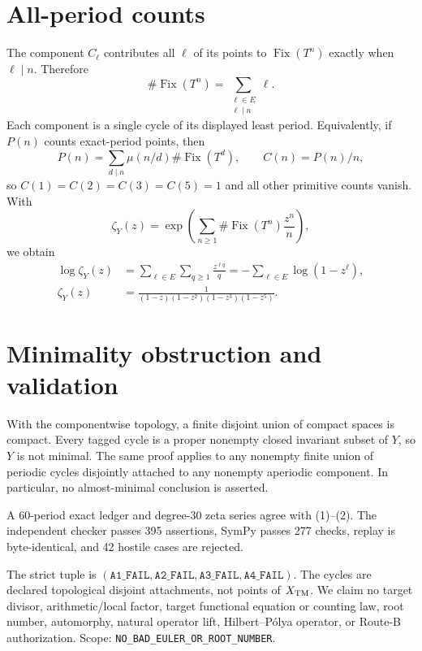 \documentclass[10pt]{article}
\begin{document}
\section{All-period counts}
The component $C_\ell$ contributes all $\ell$ of its points to
$\operatorname{Fix}(T^n)$ exactly when $\ell\mid n$.  Therefore
\begin{equation}
\#\operatorname{Fix}(T^n)=\sum_{\substack{\ell\in E\\\ell\mid n}}\ell .\tag{1}
\end{equation}
Each component is a single cycle of its displayed least period.  Equivalently,
if $P(n)$ counts exact-period points, then
\[
P(n)=\sum_{d\mid n}\mu(n/d)\#\operatorname{Fix}(T^d),
\qquad C(n)=P(n)/n,
\]
so $C(1)=C(2)=C(3)=C(5)=1$ and all other primitive counts vanish.  With
\[
\zeta_Y(z)=\exp\left(\sum_{n\geq1}\#\operatorname{Fix}(T^n)\frac{z^n}{n}\right),
\]
we obtain
\begin{align*}
\log\zeta_Y(z)
 &=\sum_{\ell\in E}\sum_{q\geq1}\frac{z^{\ell q}}q
 =-\sum_{\ell\in E}\log(1-z^\ell),\\
\zeta_Y(z)&=\frac1{(1-z)(1-z^2)(1-z^3)(1-z^5)}.\tag{2}
\end{align*}

\section{Minimality obstruction and validation}
With the componentwise topology, a finite disjoint union of compact spaces is
compact.  Every tagged cycle is a proper nonempty closed invariant subset of
$Y$, so $Y$ is not minimal.  The same proof applies to any nonempty finite
union of periodic cycles disjointly attached to any nonempty aperiodic
component.  In particular, no almost-minimal conclusion is asserted.

A 60-period exact ledger and degree-30 zeta series agree
with (1)--(2).  The independent checker passes 395 assertions, SymPy passes
277 checks, replay is byte-identical, and 42 hostile cases are rejected.

The strict tuple is $(\texttt{A1\_FAIL},\texttt{A2\_FAIL},
\texttt{A3\_FAIL},\texttt{A4\_FAIL})$.  The cycles are declared topological
disjoint attachments,
not points of $X_{\rm TM}$.  We claim no target divisor, arithmetic/local
factor, target functional equation or counting law, root number, automorphy,
natural operator lift, Hilbert--P\'olya operator, or Route-B authorization.
Scope: \texttt{NO\_BAD\_EULER\_OR\_ROOT\_NUMBER}.
\end{document}
